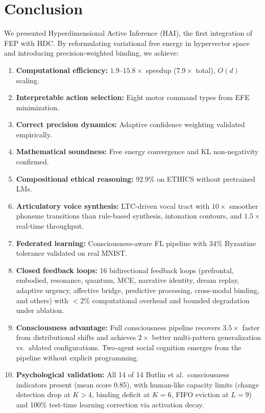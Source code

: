 \documentclass[10pt,letterpaper]{article}
\begin{document}

\section{Conclusion}

We presented Hyperdimensional Active Inference (HAI), the first integration of FEP with HDC. By reformulating variational free energy in hypervector space and introducing precision-weighted binding, we achieve:

\begin{enumerate}[nosep]
  \item \textbf{Computational efficiency:} $1.9$--$15.8\times$ speedup ($7.9\times$ total), $O(d)$ scaling.
  \item \textbf{Interpretable action selection:} Eight motor command types from EFE minimization.
  \item \textbf{Correct precision dynamics:} Adaptive confidence weighting validated empirically.
  \item \textbf{Mathematical soundness:} Free energy convergence and KL non-negativity confirmed.
  \item \textbf{Compositional ethical reasoning:} 92.9\% on ETHICS without pretrained LMs.
  \item \textbf{Articulatory voice synthesis:} LTC-driven vocal tract with $10{\times}$ smoother phoneme transitions than rule-based synthesis, intonation contours, and $1.5{\times}$ real-time throughput.
  \item \textbf{Federated learning:} Consciousness-aware FL pipeline with 34\% Byzantine tolerance validated on real MNIST.
  \item \textbf{Closed feedback loops:} 16 bidirectional feedback loops (prefrontal, embodied, resonance, quantum, MCE, narrative identity, dream replay, adaptive urgency, affective bridge, predictive processing, cross-modal binding, and others) with $<2\%$ computational overhead and bounded degradation under ablation.
  \item \textbf{Consciousness advantage:} Full consciousness pipeline recovers $3.5\times$ faster from distributional shifts and achieves $2\times$ better multi-pattern generalization vs.\ ablated configurations. Two-agent social cognition emerges from the pipeline without explicit programming.
  \item \textbf{Psychological validation:} All 14 of 14 Butlin et al.\ consciousness indicators present (mean score 0.85), with human-like capacity limits (change detection drop at $K{>}4$, binding deficit at $K{=}6$, FIFO eviction at $L{=}9$) and 100\% test-time learning correction via activation decay.
\end{enumerate}
\end{document}
